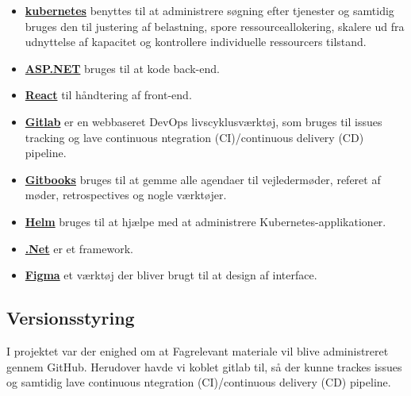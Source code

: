 \begin{itemize}
    \item \underline{\textbf{ kubernetes}} benyttes til at administrere søgning efter tjenester og samtidig bruges den til justering af belastning, spore ressourceallokering, skalere ud fra udnyttelse af kapacitet og kontrollere individuelle ressourcers tilstand.
    \item \underline{\textbf{ ASP.NET}} bruges til at kode back-end.
    \item \underline{\textbf{ React}} til håndtering af front-end.
    \item \underline{\textbf{ Gitlab}} er en webbaseret DevOps livscyklusværktøj, som bruges til issues tracking og lave continuous ntegration (CI)/continuous delivery (CD) pipeline. 
    \item \underline{\textbf{ Gitbooks}} bruges til at gemme alle agendaer til vejledermøder, referet af møder, retrospectives og nogle værktøjer.
    \item \underline{\textbf{ Helm}} bruges til at hjælpe med at administrere Kubernetes-applikationer.
    \item \underline{\textbf{ .Net}} er et framework.
    \item \underline{\textbf{ Figma}} et værktøj der bliver brugt til at design af interface.
   
  
\end{itemize}


\subsection{Versionsstyring}
I projektet var der enighed om at Fagrelevant materiale vil blive administreret gennem GitHub. Herudover havde vi koblet gitlab til, så der kunne trackes issues og samtidig lave continuous ntegration (CI)/continuous delivery (CD) pipeline.



